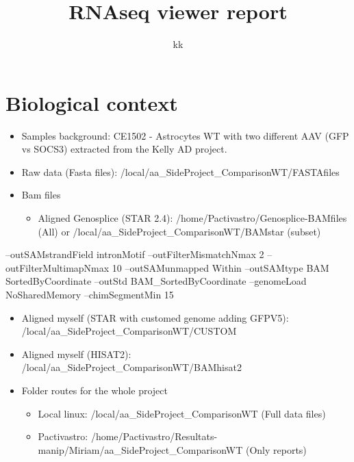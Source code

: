 \documentclass[]{article}
\title{RNAseq viewer report}
\author{kk}
\date{}
\providecommand{\tightlist}{%
  \setlength{\itemsep}{0pt}\setlength{\parskip}{0pt}}
\begin{document}
\maketitle

{
\setcounter{tocdepth}{2}
\tableofcontents
}
\hypertarget{biological-context}{%
\section{Biological context}\label{biological-context}}

\begin{itemize}
\tightlist
\item
  Samples background: CE1502 - Astrocytes WT with two different AAV (GFP
  vs SOCS3) extracted from the Kelly AD project.
\item
  Raw data (Fasta files):
  /local/aa\_SideProject\_ComparisonWT/FASTAfiles
\item
  Bam files

  \begin{itemize}
  \tightlist
  \item
    Aligned Genosplice (STAR 2.4): /home/Pactivastro/Genosplice-BAMfiles
    (All) or /local/aa\_SideProject\_ComparisonWT/BAMstar (subset)
  \end{itemize}
\end{itemize}

--outSAMstrandField intronMotif --outFilterMismatchNmax 2
--outFilterMultimapNmax 10 --outSAMunmapped Within --outSAMtype BAM
SortedByCoordinate --outStd BAM\_SortedByCoordinate --genomeLoad
NoSharedMemory --chimSegmentMin 15

\begin{itemize}
\tightlist
\item
  Aligned myself (STAR with customed genome adding GFPV5):
  /local/aa\_SideProject\_ComparisonWT/CUSTOM
\item
  Aligned myself (HISAT2):
  /local/aa\_SideProject\_ComparisonWT/BAMhisat2
\item
  Folder routes for the whole project

  \begin{itemize}
  \tightlist
  \item
    Local linux: /local/aa\_SideProject\_ComparisonWT (Full data files)
  \item
    Pactivastro:
    /home/Pactivastro/Resultats-manip/Miriam/aa\_SideProject\_ComparisonWT
    (Only reports)
  \end{itemize}
\end{itemize}
\end{document}
